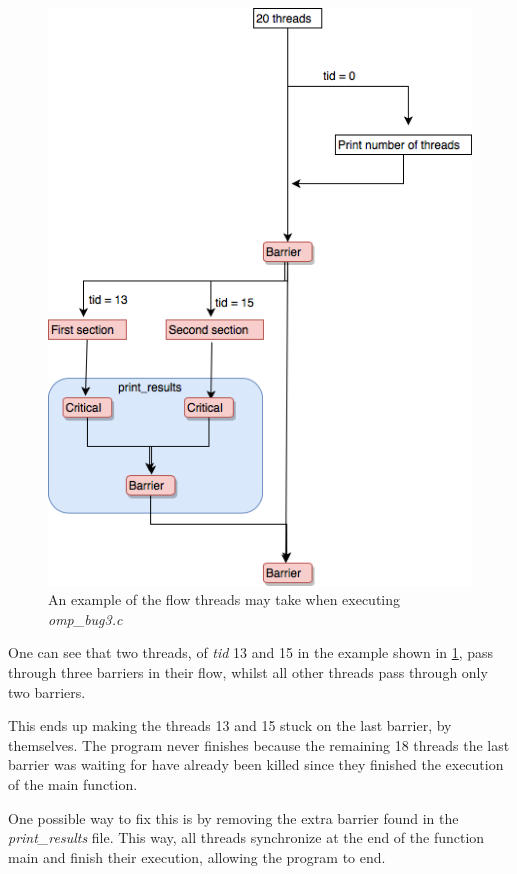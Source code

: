 \documentclass[unicode,11pt,a4paper,oneside,numbers=endperiod,openany]{scrartcl}
\begin{document}
\begin{itemize}
        \begin{figure}[H]
            \centering
            \includegraphics[width=0.9\linewidth]{ThreadFlow}
            \caption{An example of the flow threads may take when executing \textit{omp\_bug3.c}}
            \label{thread-flow}
        \end{figure}

        One can see that two threads, of \textit{tid} 13 and 15 in the example shown in \ref{thread-flow}, pass through three barriers in their flow, whilst all other threads pass through only two barriers.

        This ends up making the threads 13 and 15 stuck on the last barrier, by themselves.
        The program never finishes because the remaining 18 threads the last barrier was waiting for have already been killed since they finished the execution of the main function.

        One possible way to fix this is by removing the extra barrier found in the \textit{print\_results} file.
        This way, all threads synchronize at the end of the function main and finish their execution, allowing the program to end.


\end{itemize}
\end{document}
